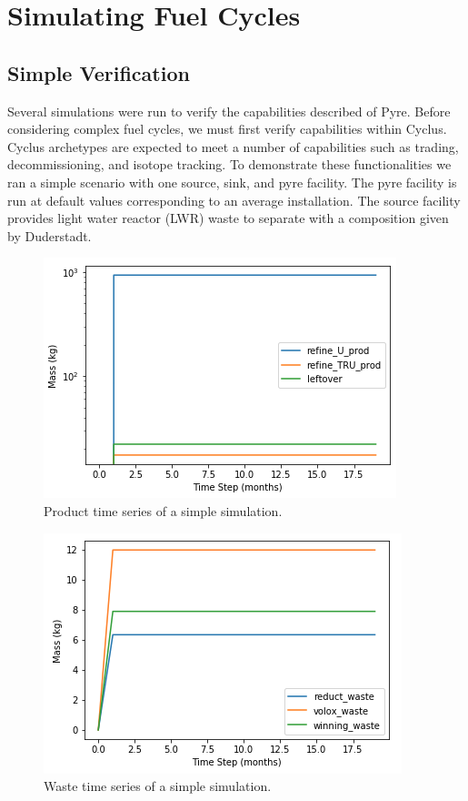 \chapter[Simulating Fuel Cycles]{Simulating Fuel Cycles}
\section{Simple Verification}
Several simulations were run to verify the capabilities described of Pyre. Before considering complex fuel cycles, we must first verify
capabilities within Cyclus. Cyclus archetypes are expected to meet a number of capabilities such as trading, decommissioning, and isotope tracking.
To demonstrate these functionalities we ran a simple scenario with one source, sink, and pyre facility. The pyre facility is run at default values 
corresponding to an average installation. The source facility provides light water reactor (LWR) waste to separate with a composition given by Duderstadt. 

\begin{figure} [h]
	\centering
	\includegraphics[width=0.65\linewidth]{images/timeseries-prod}
	\caption{Product time series of a simple simulation.}
	\label{fig:timeseries-prod}
\end{figure}



\begin{figure} [h]
	\centering
	\includegraphics[width=0.65\linewidth]{images/timeseries-waste}
	\caption{Waste time series of a simple simulation.}
	\label{fig:timeseries-waste}
\end{figure}

